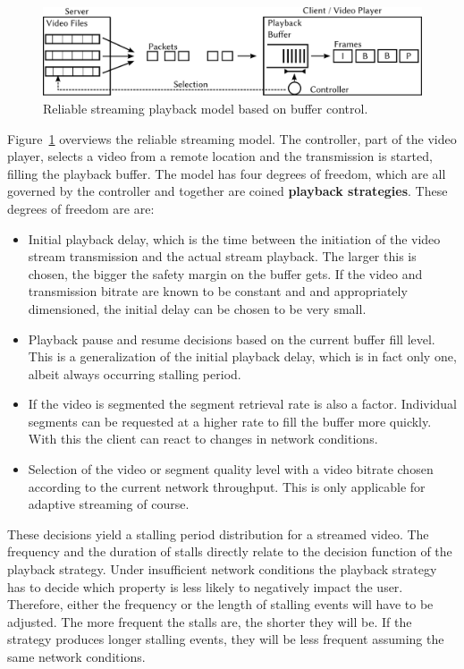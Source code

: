 \begin{figure}[htb]
	\centering
	\includegraphics[width=1.0\textwidth]{images/playback-model.pdf}
	\caption{Reliable streaming playback model based on buffer control.}
\label{c3:fig:playback-model}
\end{figure}

Figure~\ref{c3:fig:playback-model} overviews the reliable streaming model. The controller, part of the video player, selects a video from a remote location and the transmission is started, filling the playback buffer. The model has four degrees of freedom, which are all governed by the controller and together are coined \textbf{playback strategies}. These degrees of freedom are are:

\begin{itemize}
	\item Initial playback delay, which is the time between the initiation of the video stream transmission and the actual stream playback. The larger this is chosen, the bigger the safety margin on the buffer gets. If the video and transmission bitrate are known to be constant and and appropriately dimensioned, the initial delay can be chosen to be very small.

	\item Playback pause and resume decisions based on the current buffer fill level. This is a generalization of the initial playback delay, which is in fact only one, albeit always occurring stalling period.

	\item If the video is segmented the segment retrieval rate is also a factor. Individual segments can be requested at a higher rate to fill the buffer more quickly. With this the client can react to changes in network conditions.

	\item Selection of the video or segment quality level with a video bitrate chosen according to the current network throughput. This is only applicable for adaptive streaming of course.
\end{itemize}


These decisions yield a stalling period distribution for a streamed video. The frequency and the duration of stalls directly relate to the decision function of the playback strategy. Under insufficient network conditions the playback strategy has to decide which property is less likely to negatively impact the user. Therefore, either the frequency or the length of stalling events will have to be adjusted. The more frequent the stalls are, the shorter they will be. If the strategy produces longer stalling events, they will be less frequent assuming the same network conditions.

